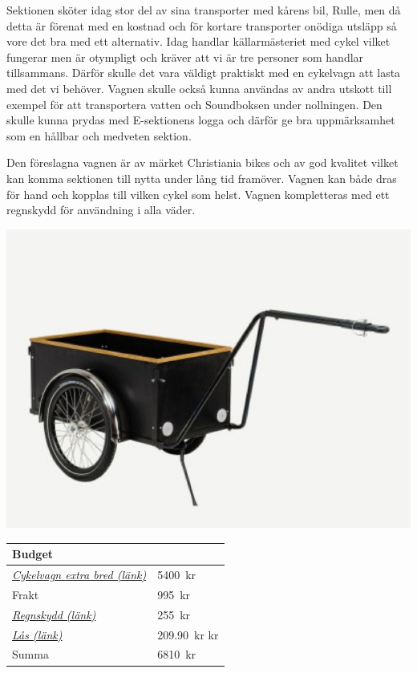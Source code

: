 \documentclass[../_main/handlingar.tex]{subfiles}
\begin{document}


Sektionen sköter idag stor del av sina transporter med kårens bil, Rulle, men då detta är förenat med en kostnad och för kortare transporter onödiga utsläpp så vore det bra med ett alternativ. Idag handlar källarmästeriet med cykel vilket fungerar men är otympligt och kräver att vi är tre personer som handlar tillsammans. Därför skulle det vara väldigt praktiskt med en cykelvagn att lasta med det vi behöver. Vagnen skulle också kunna användas av andra utskott till exempel för att transportera vatten och Soundboksen under nollningen. Den skulle kunna prydas med E-sektionens logga och därför ge bra uppmärksamhet som en hållbar och medveten sektion. 

Den föreslagna vagnen är av märket Christiania bikes och av god kvalitet vilket kan komma sektionen till nytta under lång tid framöver. Vagnen kan både dras för hand och kopplas till vilken cykel som helst. Vagnen kompletteras med ett regnskydd för användning i alla väder.\\ 
 
    \begin{center}
     \includegraphics[scale=1]{../_res/vagn.png}
    \end{center}

\newpage

   \begin{tabular}{| l | l |}
    \hline
    Budget &  \\
     \hline
    \href{http://westlingscyklar.se/category/modeller/}{\textit{Cykelvagn extra bred (länk)}}  & \SI{5400}{kr}  \\
    \hline
    Frakt & \SI{995}{kr}\\
    \hline
    \href{http://westlingscyklar.se/category/talt/}{\textit{Regnskydd (länk)}}  & \SI{255}{kr}  \\
    \hline
    \href{https://www.kjell.com/se/sortiment/hem-kontor-fritid/cykeltillbehor/cykellas/abus-cykellas-med-kombinationskod-p21014 }{\textit{Lås (länk)}}  & \SI{209,90}{kr} kr  \\
    \hline
    Summa & \SI{6810}{kr} \\
    \hline
\end{tabular}
\end{document}
